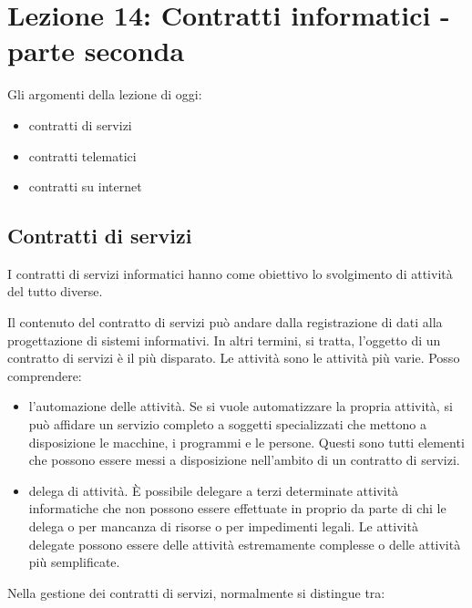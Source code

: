 \chapter{Lezione 14: Contratti informatici - parte seconda}

 Gli argomenti della lezione di oggi:
 
 \begin{itemize}
    \item contratti di servizi
    \item contratti telematici
    \item contratti su internet 
 \end{itemize}
 
 
\section{Contratti di servizi} 
I contratti di servizi informatici hanno come obiettivo lo svolgimento di attività del tutto diverse. 


Il contenuto del contratto di servizi può andare dalla registrazione di dati alla progettazione di sistemi informativi. In altri termini, si tratta, l'oggetto di un contratto di servizi è il più disparato. Le attività sono le attività più varie.
Posso comprendere:

\begin{itemize}
    \item l'automazione delle attività. Se si vuole automatizzare la propria attività, si può affidare un servizio completo a soggetti specializzati che mettono a disposizione le macchine, i programmi e le persone. Questi sono tutti elementi che possono essere messi a disposizione nell'ambito di un contratto di servizi. 
    \item delega di attività. È possibile delegare a terzi determinate attività informatiche che non possono essere effettuate in proprio da parte di chi le delega o per mancanza di risorse o per impedimenti legali. Le attività delegate possono essere delle attività estremamente complesse o delle attività più semplificate. 
\end{itemize}   

  
 Nella gestione dei contratti di servizi, normalmente si distingue tra:
 
